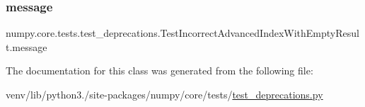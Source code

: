 \subsubsection{\texorpdfstring{message}{message}}
{\footnotesize\ttfamily numpy.\+core.\+tests.\+test\+\_\+deprecations.\+Test\+Incorrect\+Advanced\+Index\+With\+Empty\+Result.\+message\hspace{0.3cm}{\ttfamily [static]}}



The documentation for this class was generated from the following file\+:\begin{DoxyCompactItemize}
\item 
venv/lib/python3./site-\/packages/numpy/core/tests/\hyperlink{core_2tests_2test__deprecations_8py}{test\+\_\+deprecations.\+py}\end{DoxyCompactItemize}
